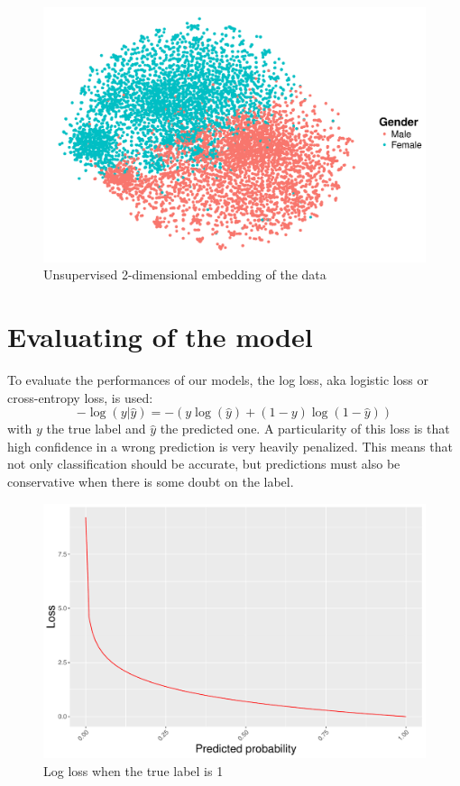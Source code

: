\documentclass[a4paper,11pt,openany,extrafontsizes,oneside,article,twocolumn]{memoir}
\newcommand{\yTrue}{y}
\newcommand{\yPred}{\hat{y}}
\begin{document}
\begin{figure}[h]
  \centering
  \includegraphics[scale=0.3]{tsne}
  \caption{Unsupervised 2-dimensional embedding of the data}%
  \label{fig.tsne}
\end{figure}

\section{Evaluating of the model}

To evaluate the performances of our models, the log loss, aka logistic
loss or cross-entropy loss, is used:
\[ -\log(\yTrue | \yPred) = -(\yTrue \log(\yPred) + (1 - \yTrue)
  \log(1 - \yPred))\] with $y$ the true label and $\hat{y}$ the
predicted one. A particularity of this loss is that high confidence in
a wrong prediction is very heavily penalized. This means that not only
classification should be accurate, but predictions must also be
conservative when there is some doubt on the label.

\begin{figure}[h]
  \centering
  \includegraphics[scale=0.3]{loss}
  \caption{Log loss when the true label is 1}%
  \label{fig.loss}
\end{figure}
\end{document}

